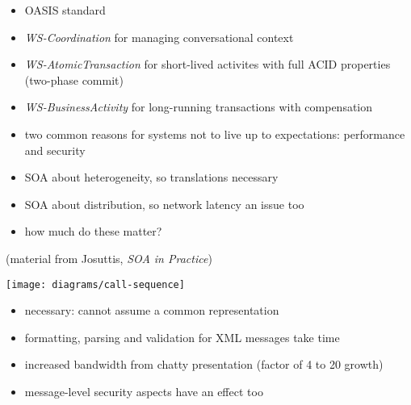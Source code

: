 \documentclass{sepslide-soa-faked} %
\begin{document}
\begin{slide}
\begin{itemize}
\item OASIS standard
\item \emph{WS-Coordination} for managing conversational context
\item \emph{WS-AtomicTransaction} for short-lived activites with full ACID properties (two-phase commit)
\item \emph{WS-BusinessActivity} for long-running transactions with compensation
\end{itemize}
\end{slide}


\begin{slide}
\begin{itemize}
\item two common reasons for systems not to live up to expectations:
  performance and security
\item SOA about heterogeneity, so translations necessary
\item SOA about distribution, so network latency an issue too
\item how much do these matter?
\end{itemize}
(material from Josuttis, \textit{SOA in Practice})
\end{slide}

\begin{slide}
\begin{flushleft}
\texttt{[image: diagrams/call-sequence]}
\end{flushleft}
\end{slide}

\begin{slide}
\begin{itemize}
\item necessary: cannot assume a common representation
\item formatting, parsing and validation for XML messages take time
\item increased bandwidth from chatty presentation (factor of 4 to 20 growth)
\item message-level security aspects have an effect too
\end{itemize}
\end{slide}
\end{document}
